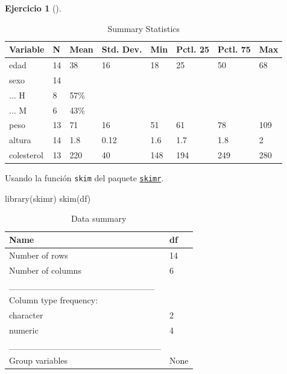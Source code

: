 \documentclass[
  a4paper,
]{scrreport}
\newenvironment{Shaded}{\begin{snugshade}}{\end{snugshade}}
\newcommand{\FunctionTok}[1]{\textcolor[rgb]{0.28,0.35,0.67}{#1}}
\newcommand{\NormalTok}[1]{\textcolor[rgb]{0.00,0.23,0.31}{#1}}
\theoremstyle{definition}
\newtheorem{exercise}{Ejercicio}[chapter]
\theoremstyle{remark}
\begin{document}
\begin{exercise}[]
\begin{enumerate}
\begin{tcolorbox}
\begin{table}
  \caption{Summary Statistics}
  \centering
  \begin{tabular}[t]{llllllll}
  \toprule
  Variable & N & Mean & Std. Dev. & Min & Pctl. 25 & Pctl. 75 & Max\\
  \midrule
  edad & 14 & 38 & 16 & 18 & 25 & 50 & 68\\
  sexo & 14 &  &  &  &  &  & \\
  ... H & 8 & 57\% &  &  &  &  & \\
  ... M & 6 & 43\% &  &  &  &  & \\
  peso & 13 & 71 & 16 & 51 & 61 & 78 & 109\\
  \addlinespace
  altura & 14 & 1.8 & 0.12 & 1.6 & 1.7 & 1.8 & 2\\
  colesterol & 13 & 220 & 40 & 148 & 194 & 249 & 280\\
  \bottomrule
  \end{tabular}
  \end{table}

  \end{tcolorbox}

  \begin{tcolorbox}[enhanced jigsaw, coltitle=black, left=2mm, colback=white, leftrule=.75mm, toptitle=1mm, breakable, bottomrule=.15mm, titlerule=0mm, bottomtitle=1mm, title=\textcolor{quarto-callout-tip-color}{\faLightbulb}\hspace{0.5em}{Solución 3}, arc=.35mm, toprule=.15mm, rightrule=.15mm, colframe=quarto-callout-tip-color-frame, opacityback=0, colbacktitle=quarto-callout-tip-color!10!white, opacitybacktitle=0.6]

  Usando la función \texttt{skim} del paquete
  \href{https://cran.r-project.org/web/packages/skimr/vignettes/skimr.html}{\texttt{skimr}}.

\begin{Shaded}
\begin{Highlighting}[]
\FunctionTok{library}\NormalTok{(skimr)}
\FunctionTok{skim}\NormalTok{(df)}
\end{Highlighting}
\end{Shaded}

  \begin{table}

  \caption{Data summary}
  \centering
  \begin{tabular}[t]{l|l}
  \hline
  Name & df\\
  \hline
  Number of rows & 14\\
  \hline
  Number of columns & 6\\
  \hline
  \_\_\_\_\_\_\_\_\_\_\_\_\_\_\_\_\_\_\_\_\_\_\_ & \\
  \hline
  Column type frequency: & \\
  \hline
  character & 2\\
  \hline
  numeric & 4\\
  \hline
  \_\_\_\_\_\_\_\_\_\_\_\_\_\_\_\_\_\_\_\_\_\_\_\_ & \\
  \hline
  Group variables & None\\
  \hline
  \end{tabular}
  \end{table}


\end{tcolorbox}
\end{enumerate}
\end{exercise}
\end{document}
